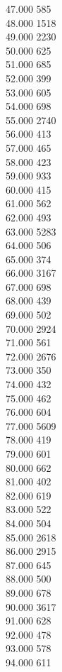 { 47.000	585 \\
 48.000	1518 \\
 49.000	2230 \\
 50.000	625 \\
 51.000	685 \\
 52.000	399 \\
 53.000	605 \\
 54.000	698 \\
 55.000	2740 \\
 56.000	413 \\
 57.000	465 \\
 58.000	423 \\
 59.000	933 \\
 60.000	415 \\
 61.000	562 \\
 62.000	493 \\
 63.000	5283 \\
 64.000	506 \\
 65.000	374 \\
 66.000	3167 \\
 67.000	698 \\
 68.000	439 \\
 69.000	502 \\
 70.000	2924 \\
 71.000	561 \\
 72.000	2676 \\
 73.000	350 \\
 74.000	432 \\
 75.000	462 \\
 76.000	604 \\
 77.000	5609 \\
 78.000	419 \\
 79.000	601 \\
 80.000	662 \\
 81.000	402 \\
 82.000	619 \\
 83.000	522 \\
 84.000	504 \\
 85.000	2618 \\
 86.000	2915 \\
 87.000	645 \\
 88.000	500 \\
 89.000	678 \\
 90.000	3617 \\
 91.000	628 \\
 92.000	478 \\
 93.000	578 \\
 94.000	611 \\
}
